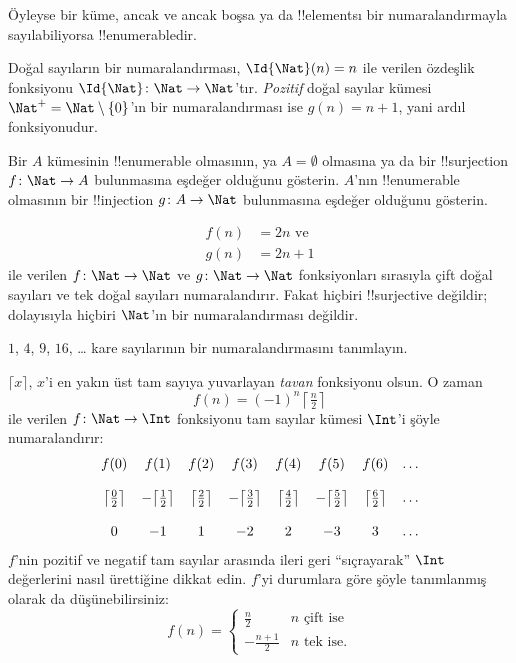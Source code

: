 \documentclass[../../../include/open-logic-section]{subfiles}
\begin{document}
\begin{explain}
Öyleyse bir küme, ancak ve ancak boşsa ya da !!{element}s{}ı bir
numaralandırmayla sayılabiliyorsa !!{enumerable}{}dir.
\end{explain}

\begin{ex}
Doğal sayıların bir numaralandırması, $\Id{\Nat}(n)=n$ ile verilen özdeşlik
fonksiyonu $\Id{\Nat}\colon\Nat\to\Nat$'tır. \emph{Pozitif} doğal sayılar
kümesi $\Nat^+=\Nat\setminus\{0\}$'ın bir numaralandırması ise $g(n)=n+1$,
yani ardıl fonksiyonudur.
\end{ex}

\begin{prob}
Bir $A$ kümesinin !!{enumerable} olmasının, ya $A=\emptyset$ olmasına ya da
bir !!{surjection} $f\colon\Nat\to A$ bulunmasına eşdeğer olduğunu gösterin.
$A$'nın !!{enumerable} olmasının bir !!{injection} $g\colon A\to\Nat$
bulunmasına eşdeğer olduğunu gösterin.
\end{prob}

\begin{ex}
\begin{align*}
  f(n) & = 2n \text{ ve}\\
  g(n) & = 2n+1
\end{align*}
ile verilen $f\colon\Nat\to\Nat$ ve $g\colon\Nat\to\Nat$ fonksiyonları
sırasıyla çift doğal sayıları ve tek doğal sayıları numaralandırır. Fakat
hiçbiri !!{surjective} değildir; dolayısıyla hiçbiri $\Nat$'ın bir
numaralandırması değildir.
\end{ex}

\begin{prob}
$1$, $4$, $9$, $16$, \dots{} kare sayılarının bir numaralandırmasını
tanımlayın.
\end{prob}

\begin{ex}
$\lceil x\rceil$, $x$'i en yakın üst tam sayıya yuvarlayan \emph{tavan}
fonksiyonu olsun. O zaman
\[
  f(n) = (-1)^{n} \left\lceil\tfrac{n}{2}\right\rceil
\]
ile verilen $f\colon\Nat\to\Int$ fonksiyonu tam sayılar kümesi $\Int$'i
şöyle numaralandırır:
\[
\begin{array}{c c c c c c c c}
f(0) & f(1) & f(2) & f(3) & f(4) & f(5) & f(6) & \dots \\ \\
\big\lceil \tfrac{0}{2} \big\rceil & -\big\lceil \tfrac{1}{2}\big\rceil &  \big\lceil \tfrac{2}{2} \big\rceil & -\big\lceil \tfrac{3}{2} \big\rceil & \big\lceil \tfrac{4}{2} \big\rceil  & -\big\lceil \tfrac{5}{2}\big\rceil & \big\lceil \tfrac{6}{2} \big\rceil & \dots \\ \\
0 & -1 & 1 & -2 & 2 & -3 & 3& \dots
\end{array}
\]
$f$'nin pozitif ve negatif tam sayılar arasında ileri geri ``sıçrayarak''
$\Int$ değerlerini nasıl ürettiğine dikkat edin. $f$'yi durumlara göre şöyle
tanımlanmış olarak da düşünebilirsiniz:
\[
f(n) = \begin{cases}
  \frac{n}{2} & \text{$n$ çift ise}\\
  -\frac{n+1}{2} & \text{$n$ tek ise.}
  \end{cases}
\]
\end{ex}
\end{document}
